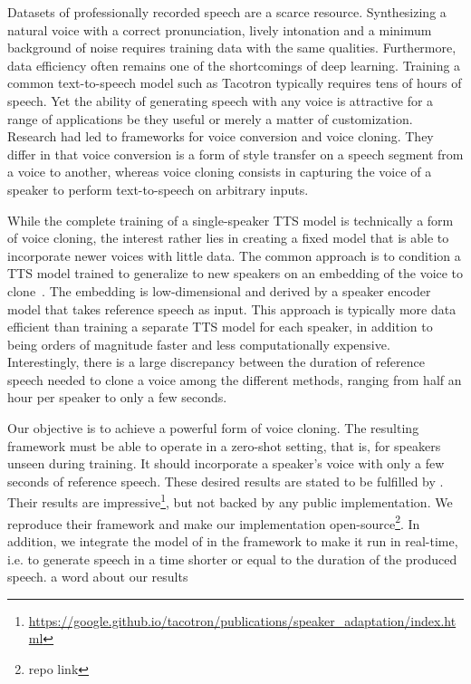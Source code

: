 \documentclass[a4paper, oneside, 12pt, english]{article}
\begin{document}
Datasets of professionally recorded speech are a scarce resource. Synthesizing a natural voice with a correct pronunciation, lively intonation and a minimum background of noise requires training data with the same qualities. Furthermore, data efficiency often remains one of the shortcomings of deep learning. Training a common text-to-speech model such as Tacotron \citep{Tacotron1} typically requires tens of hours of speech. %
Yet the ability of generating speech with any voice is attractive for a range of applications be they useful or merely a matter of customization. Research had led to frameworks for voice conversion and voice cloning. They differ in that voice conversion is a form of style transfer on a speech segment from a voice to another, whereas voice cloning consists in capturing the voice of a speaker to perform text-to-speech on arbitrary inputs. 

While the complete training of a single-speaker TTS model is technically a form of voice cloning, the interest rather lies in creating a fixed model that is able to incorporate newer voices with little data. The common approach is to condition a TTS model trained to generalize to new speakers on an embedding of the voice to clone~\citep{DeepVoice2, CloningFewSamples, SV2TTS}. The embedding is low-dimensional and derived by a speaker encoder model that takes reference speech as input. This approach is typically more data efficient than training a separate TTS model for each speaker, in addition to being orders of magnitude faster and less computationally expensive. Interestingly, there is a large discrepancy between the duration of reference speech needed to clone a voice among the different methods, ranging from half an hour per speaker to only a few seconds.

Our objective is to achieve a powerful form of voice cloning. The resulting framework must be able to operate in a zero-shot setting, that is, for speakers unseen during training. It should incorporate a speaker's voice with only a few seconds of reference speech. These desired results are stated to be fulfilled by \citep{SV2TTS}. Their results are impressive\footnote{\url{https://google.github.io/tacotron/publications/speaker_adaptation/index.html}}, but not backed by any public implementation. We reproduce their framework and make our implementation open-source\footnote{\color{red} repo link}. In addition, we integrate the model of \citep{EfficientNeuralAudioSynthesis} in the framework to make it run in real-time, i.e. to generate speech in a time shorter or equal to the duration of the produced speech. \color{red} a word about our results \color{black}
\end{document}
